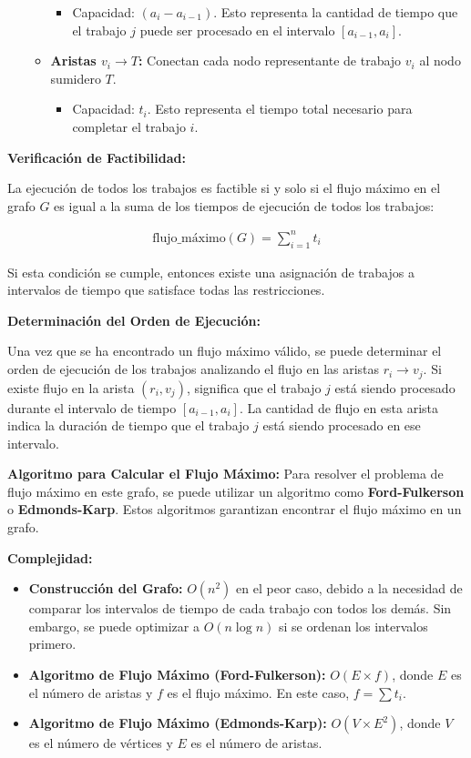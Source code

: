 \documentclass[14pt]{extarticle}
\begin{document}
\begin{itemize}
\begin{itemize}
\begin{itemize}
                \item Capacidad: $(a_i - a_{i-1})$. Esto representa la cantidad de tiempo que el trabajo $j$ puede ser procesado en el intervalo $[a_{i-1}, a_i]$.
            \end{itemize}
        \item \textbf{Aristas $v_i \rightarrow T$:} Conectan cada nodo representante de trabajo $v_i$ al nodo sumidero $T$.
            \begin{itemize}
                \item Capacidad: $t_i$. Esto representa el tiempo total necesario para completar el trabajo $i$.
            \end{itemize}
    \end{itemize}
\end{itemize}

\textbf{Verificación de Factibilidad:}

La ejecución de todos los trabajos es factible si y solo si el flujo máximo en el grafo $G$ es igual a la suma de los tiempos de ejecución de todos los trabajos:

\begin{align*}
\text{flujo\_máximo}(G) = \sum_{i=1}^{n} t_i
\end{align*}

Si esta condición se cumple, entonces existe una asignación de trabajos a intervalos de tiempo que satisface todas las restricciones.

\textbf{Determinación del Orden de Ejecución:}

Una vez que se ha encontrado un flujo máximo válido, se puede determinar el orden de ejecución de los trabajos analizando el flujo en las aristas $r_i \rightarrow v_j$. Si existe flujo en la arista $(r_i, v_j)$, significa que el trabajo $j$ está siendo procesado durante el intervalo de tiempo $[a_{i-1}, a_i]$. La cantidad de flujo en esta arista indica la duración de tiempo que el trabajo $j$ está siendo procesado en ese intervalo.

\textbf{Algoritmo para Calcular el Flujo Máximo:} Para resolver el problema de flujo máximo en este grafo, se puede utilizar un algoritmo como \textbf{Ford-Fulkerson} o \textbf{Edmonds-Karp}. Estos algoritmos garantizan encontrar el flujo máximo en un grafo.

\textbf{Complejidad:}

\begin{itemize}
    \item \textbf{Construcción del Grafo:} $O(n^2)$ en el peor caso, debido a la necesidad de comparar los intervalos de tiempo de cada trabajo con todos los demás. Sin embargo, se puede optimizar a $O(n \log n)$ si se ordenan los intervalos primero.
    \item \textbf{Algoritmo de Flujo Máximo (Ford-Fulkerson):} $O(E \times f)$, donde $E$ es el número de aristas y $f$ es el flujo máximo. En este caso, $f = \sum t_i$.
    \item \textbf{Algoritmo de Flujo Máximo (Edmonds-Karp):} $O(V \times E^2)$, donde $V$ es el número de vértices y $E$ es el número de aristas.
\end{itemize}
\end{document}
